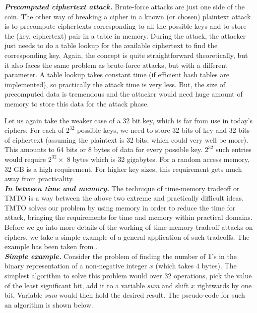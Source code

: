 \noindent \textit{\textbf{Precomputed ciphertext attack.}} Brute-force attacks are just one side of the coin. The other way of breaking a cipher in a known (or chosen) plaintext attack is to precompute ciphertexts corresponding to all the possible keys and to store the (key, ciphertext) pair in a table in memory. During the attack, the attacker just needs to do a table lookup for the available ciphertext to find the corresponding key. Again, the concept is quite straightforward theoretically, but it also faces the same problem as brute-force attacks, but with a different parameter. A table lookup takes constant time (if efficient hash tables are implemented), so practically the attack time is very less. But, the size of precomputed data is tremendous and the attacker would need huge amount of memory to store this data for the attack phase. 

Let us again take the weaker case of a 32 bit key, which is far from use in today's ciphers. For each of $2^{32}$ possible keys, we need to store 32 bits of key and 32 bits of ciphertext (assuming the plaintext is 32 bits, which could very well be more). This amounts to 64 bits or 8 bytes of data for every possible key. $2^{32}$ such entries would require $2^{32} \times$ 8 bytes which is 32 gigabytes. For a random access memory, 32 GB is a high requirement. For higher key sizes, this requirement gets much away from practicality.\\

\noindent \textit{\textbf{In between time and memory.}} The technique of time-memory tradeoff or TMTO is a way between the above two extreme and practically difficult ideas. TMTO solves our problem by using memory in order to reduce the time for attack, bringing the requirements for time and memory within  practical domains. Before we go into more details of the working of time-memory tradeoff attacks on ciphers, we take a simple example of a general application of such tradeoffs. The example has been taken from \cite{stamp2003out}. \\

\noindent \textit{\textbf{Simple example.}} Consider the problem of finding the number of \textbf{1}'s in the binary representation of a non-negative integer $x$ (which takes $4$ bytes). The simplest algorithm to solve this problem would over 32 operations, pick the value of the least significant bit, add it to a variable \textit{sum} and shift $x$ rightwards by one bit. Variable \textit{sum} would then hold the desired result. The pseudo-code for such an algorithm is shown below.

